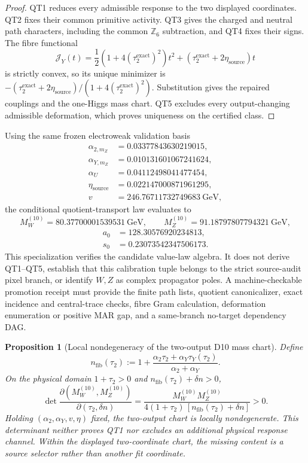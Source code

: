 \documentclass[11pt]{article}
\newtheorem{proposition}[theorem]{Proposition}
\begin{document}
\begin{proof}
QT1 reduces every admissible response to the two displayed coordinates.  QT2
fixes their common primitive activity.  QT3 gives the charged and neutral path
characters, including the common \(\mathbb Z_6\) subtraction, and QT4 fixes
their signs.  The fibre functional
\[
\mathcal J_Y(t)
=\frac12(1+4(\tau_2^{\mathrm{exact}})^2)t^2
+(\tau_2^{\mathrm{exact}}+2\eta_{\mathrm{source}})t
\]
is strictly convex, so its unique minimizer is
\(-(\tau_2^{\mathrm{exact}}+2\eta_{\mathrm{source}})
 /(1+4(\tau_2^{\mathrm{exact}})^2)\).
Substitution gives the repaired couplings and the one-Higgs mass chart.  QT5
excludes every output-changing admissible deformation, which proves uniqueness
on the certified class.
\end{proof}

Using the same frozen electroweak validation basis
\[
\begin{aligned}
\alpha_{2,m_Z}&=0.03377843630219015,\\
\alpha_{Y,m_Z}&=0.010131601067241624,\\
\alpha_U&=0.04112498041477454,\\
\eta_{\mathrm{source}}&=0.022147000871961295,\\
v&=246.76711732749683~\mathrm{GeV},
\end{aligned}
\]
the conditional quotient-transport law evaluates to
\[
M_W^{(10)}=80.37700001539531~\mathrm{GeV},
\qquad
M_Z^{(10)}=91.18797807794321~\mathrm{GeV},
\]
\[
\begin{aligned}
a_0&=128.30576920234813,\\
s_0&=0.23073542347506173.
\end{aligned}
\]
This specialization verifies the candidate value-law algebra. It does not
derive QT1--QT5, establish that this calibration tuple belongs to the strict
source-audit pixel branch, or identify \(W,Z\) as complex propagator poles.
A machine-checkable promotion receipt must provide the finite path lists,
quotient canonicalizer, exact incidence and central-trace checks, fibre Gram
calculation, deformation enumeration or positive MAR gap, and a same-branch
no-target dependency DAG.

\begin{proposition}[Local nondegeneracy of the two-output D10 mass chart]
Define
\[
n_{\mathrm{fib}}(\tau_2)
:=
1+\frac{\alpha_2\tau_2+\alpha_Y\tau_Y(\tau_2)}
{\alpha_2+\alpha_Y}.
\]
On the physical domain
\(1+\tau_2>0\) and
\(n_{\mathrm{fib}}(\tau_2)+\delta n>0\),
\[
\det
\frac{\partial(M_W^{(10)},M_Z^{(10)})}
{\partial(\tau_2,\delta n)}
=
\frac{M_W^{(10)}M_Z^{(10)}}
{4(1+\tau_2)\,[n_{\mathrm{fib}}(\tau_2)+\delta n]}
>0.
\]
Holding \((\alpha_2,\alpha_Y,v,\eta)\) fixed, the two-output chart is locally
nondegenerate.  This determinant neither proves QT1 nor excludes an additional
physical response channel.  Within the displayed two-coordinate chart, the
missing content is a source selector rather than another fit coordinate.
\end{proposition}
\end{document}
